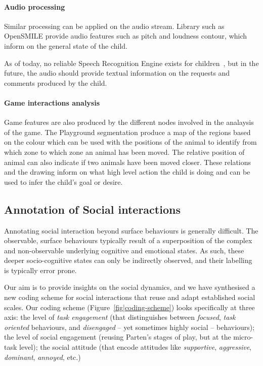 \documentclass[sigconf]{acmart}
\begin{document}
\paragraph{Audio processing}

Similar processing can be applied on the audio stream. Library such as OpenSMILE
provide audio features such as pitch and loudness contour, which inform on the
general state of the child.

As of today, no reliable Speech Recognition Engine exists for
children~\cite{kennedy2017child}, but in the future, the audio should provide
textual information on the requests and comments produced by the child.

\paragraph{Game interactions analysis}


Game features are also produced by the different nodes involved in the analaysis
of the game. The Playground segmentation produce a map of the regions based on
the colour which can be used with the positions of the animal to identify from
which zone to which zone an animal has been moved. The relative position of
animal can also indicate if two animals have been moved closer. These relations
and the drawing inform on what high level action the child is doing and can be
used to infer the child's goal or desire.

\subsection{Annotation of Social interactions}
\label{sec|coding-scheme}

Annotating social interaction beyond surface behaviours is generally difficult.
The observable, surface behaviours typically result of a superposition of the
complex and non-observable underlying cognitive and emotional states. As
such, these deeper socio-cognitive states can only be indirectly observed,
and their labelling is typically error prone.

Our aim is to provide insights on the social dynamics, and we have synthesised a
new coding scheme for social interactions that reuse and adapt established
social scales. Our coding scheme (Figure~\ref{fig|coding-scheme}) looks specifically
at three axis: the level of \emph{task engagement} (that distinguishes between
\emph{focused}, \emph{task oriented} behaviours, and \emph{disengaged} -- yet
sometimes highly social -- behaviours); the level of social engagement (reusing
Parten's stages of play, but at the micro-task level); the social attitude (that
encode attitudes like \emph{supportive}, \emph{aggressive}, \emph{dominant},
\emph{annoyed}, etc.)
\end{document}
